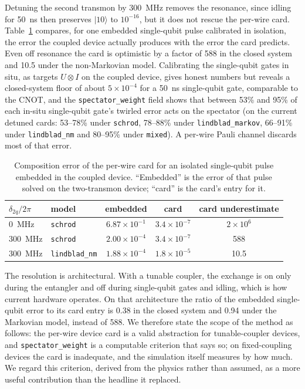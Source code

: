 \documentclass[10pt]{article}
\begin{document}
Detuning the second transmon by 300~MHz removes the resonance, since idling
for 50~ns then preserves $|10\rangle$ to $10^{-16}$, but it does not rescue
the per-wire card. Table~\ref{tab:composition} compares, for one embedded
single-qubit pulse calibrated in isolation, the error the coupled device
actually produces with the error the card predicts. Even off resonance the card
is optimistic by a factor of 588 in the closed system and 10.5 under the
non-Markovian model. Calibrating the single-qubit gates in situ, as targets
$U \otimes I$ on the coupled device, gives honest numbers but reveals a
closed-system floor of about $5\times10^{-4}$ for a 50~ns single-qubit gate,
comparable to the CNOT, and the \texttt{spectator\_weight} field shows that
between 53\% and 95\% of each in-situ single-qubit gate's twirled error acts
on the spectator (on the current detuned cards: 53--78\% under
\texttt{schrod}, 78--88\% under \texttt{lindblad\_markov}, 66--91\% under
\texttt{lindblad\_nm} and 80--95\% under \texttt{mixed}). A per-wire Pauli
channel discards most of that error.

\begin{table}[htbp]
\centering
\caption{Composition error of the per-wire card for an isolated single-qubit
pulse embedded in the coupled device. ``Embedded'' is the error of that pulse
solved on the two-transmon device; ``card'' is the card's entry for it.}
\label{tab:composition}
\small
\begin{tabular}{llccc}
\toprule
$\delta_{2q}/2\pi$ & model & embedded & card & card underestimate \\
\midrule
0~MHz   & \texttt{schrod}       & $6.87\times10^{-1}$ & $3.4\times10^{-7}$ & $2\times10^{6}$ \\
300~MHz & \texttt{schrod}       & $2.00\times10^{-4}$ & $3.4\times10^{-7}$ & 588 \\
300~MHz & \texttt{lindblad\_nm} & $1.88\times10^{-4}$ & $1.8\times10^{-5}$ & 10.5 \\
\bottomrule
\end{tabular}
\end{table}

The resolution is architectural. With a tunable coupler, the exchange is on
only during the entangler and off during single-qubit gates and idling, which
is how current hardware operates. On that architecture the ratio of the
embedded single-qubit error to its card entry is 0.38 in the closed system and
0.94 under the Markovian model, instead of 588. We therefore state the scope of
the method as follows: the per-wire device card is a valid abstraction for
tunable-coupler devices, and \texttt{spectator\_weight} is a computable
criterion that says so; on fixed-coupling devices the card is inadequate, and
the simulation itself measures by how much. We regard this criterion, derived
from the physics rather than assumed, as a more useful contribution than the
headline it replaced.
\end{document}
